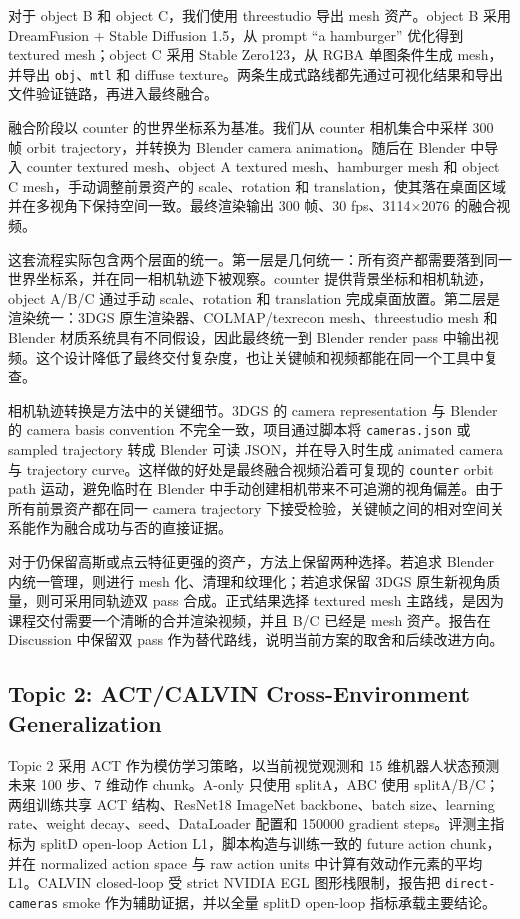 \documentclass{article}
\begin{document}
	对于 object B 和 object C，我们使用 threestudio 导出 mesh 资产。object B 采用 DreamFusion + Stable Diffusion 1.5，从 prompt ``a hamburger'' 优化得到 textured mesh；object C 采用 Stable Zero123，从 RGBA 单图条件生成 mesh，并导出 \texttt{obj}、\texttt{mtl} 和 diffuse texture。两条生成式路线都先通过可视化结果和导出文件验证链路，再进入最终融合。

	融合阶段以 counter 的世界坐标系为基准。我们从 counter 相机集合中采样 300 帧 orbit trajectory，并转换为 Blender camera animation。随后在 Blender 中导入 counter textured mesh、object A textured mesh、hamburger mesh 和 object C mesh，手动调整前景资产的 scale、rotation 和 translation，使其落在桌面区域并在多视角下保持空间一致。最终渲染输出 300 帧、30 fps、3114$\times$2076 的融合视频。

	这套流程实际包含两个层面的统一。第一层是几何统一：所有资产都需要落到同一世界坐标系，并在同一相机轨迹下被观察。counter 提供背景坐标和相机轨迹，object A/B/C 通过手动 scale、rotation 和 translation 完成桌面放置。第二层是渲染统一：3DGS 原生渲染器、COLMAP/texrecon mesh、threestudio mesh 和 Blender 材质系统具有不同假设，因此最终统一到 Blender render pass 中输出视频。这个设计降低了最终交付复杂度，也让关键帧和视频都能在同一个工具中复查。

	相机轨迹转换是方法中的关键细节。3DGS 的 camera representation 与 Blender 的 camera basis convention 不完全一致，项目通过脚本将 \texttt{cameras.json} 或 sampled trajectory 转成 Blender 可读 JSON，并在导入时生成 animated camera 与 trajectory curve。这样做的好处是最终融合视频沿着可复现的 \texttt{counter} orbit path 运动，避免临时在 Blender 中手动创建相机带来不可追溯的视角偏差。由于所有前景资产都在同一 camera trajectory 下接受检验，关键帧之间的相对空间关系能作为融合成功与否的直接证据。

	对于仍保留高斯或点云特征更强的资产，方法上保留两种选择。若追求 Blender 内统一管理，则进行 mesh 化、清理和纹理化；若追求保留 3DGS 原生新视角质量，则可采用同轨迹双 pass 合成。正式结果选择 textured mesh 主路线，是因为课程交付需要一个清晰的合并渲染视频，并且 B/C 已经是 mesh 资产。报告在 Discussion 中保留双 pass 作为替代路线，说明当前方案的取舍和后续改进方向。

	\subsection{Topic 2: ACT/CALVIN Cross-Environment Generalization}

	Topic 2 采用 ACT 作为模仿学习策略，以当前视觉观测和 15 维机器人状态预测未来 100 步、7 维动作 chunk。A-only 只使用 splitA，ABC 使用 splitA/B/C；两组训练共享 ACT 结构、ResNet18 ImageNet backbone、batch size、learning rate、weight decay、seed、DataLoader 配置和 150000 gradient steps。评测主指标为 splitD open-loop Action L1，脚本构造与训练一致的 future action chunk，并在 normalized action space 与 raw action units 中计算有效动作元素的平均 L1。CALVIN closed-loop 受 strict NVIDIA EGL 图形栈限制，报告把 \texttt{direct-cameras} smoke 作为辅助证据，并以全量 splitD open-loop 指标承载主要结论。
\end{document}
